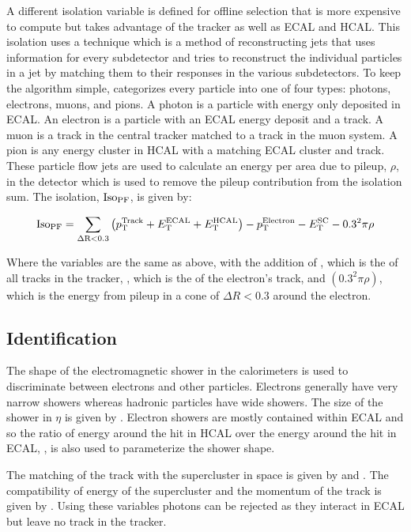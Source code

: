 A different isolation variable is defined for offline selection that is more
expensive to compute but takes advantage of the tracker as well as ECAL and
HCAL. This isolation uses a \particleflow\cite{particle_flow_2010} technique 
which is a method of reconstructing jets that uses information for every
subdetector and tries to reconstruct the individual particles in a jet by
matching them to their responses in the various subdetectors. To keep the
algorithm simple, \particleflow categorizes every particle into one of four
types: photons, electrons, muons, and pions. A photon is a particle with energy
only deposited in ECAL. An electron is a particle with an ECAL energy deposit
and a track. A muon is a track in the central tracker matched to a track in the
muon system. A pion is any energy cluster in HCAL with a matching ECAL cluster
and track. These particle flow jets are used to calculate an energy per area
due to pileup, $\rho$, in the detector which is used to remove the pileup
contribution from the isolation sum. The \particleflow isolation, $\text{Iso}_{\text{PF}}$, is
given by:

\begin{equation}
    \text{Iso}_{\text{PF}} = \sum_{\Delta \text{R}<0.3} \left(p_{\mathrm{T}}^{\text{Track}} + E_{\mathrm{T}}^{\text{ECAL}} + E_{\mathrm{T}}^{\text{HCAL}}\right) - p_{\mathrm{T}}^{\text{Electron}}
    - E_{\mathrm{T}}^{\text{SC}} - 0.3^{2} \pi \rho
\end{equation}

Where the variables are the same as above, with the addition of \ptTrack, which
is the \pt of all tracks in the tracker, \ptElectron, which is the \pt of the
electron's track, and $\left(0.3^{2} \pi \rho\right)$, which is the energy from
pileup in a cone of $\Delta R < 0.3$ around the electron.

\subsection{Identification}

The shape of the electromagnetic shower in the calorimeters is used to
discriminate between electrons and other particles. Electrons generally have
very narrow showers whereas hadronic particles have wide showers. The size of
the shower in $\eta$ is given by \sigmaietaieta. Electron showers are mostly
contained within ECAL and so the ratio of energy around the hit in HCAL over
the energy around the hit in ECAL, \HOverE, is also used to parameterize the
shower shape.

The matching of the track with the supercluster in \coordetaphi space is given
by \dphiin and \detain.  The compatibility of energy of the supercluster and
the momentum of the track is given by \ooeoop. Using these variables photons
can be rejected as they interact in ECAL but leave no track in the tracker.

